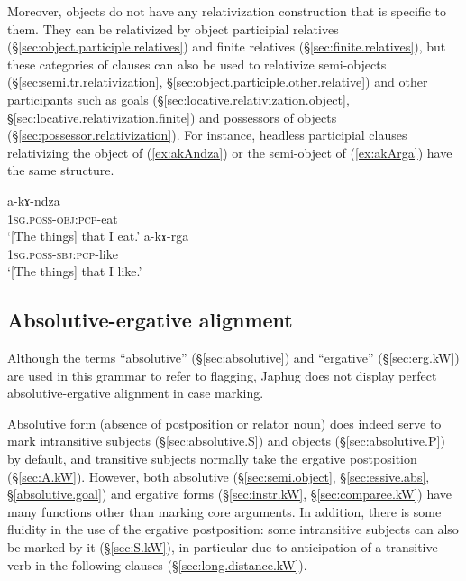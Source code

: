Moreover, objects do not have any relativization construction that is specific to them. They can be relativized by object participial relatives (§\ref{sec:object.participle.relatives}) and finite relatives (§\ref{sec:finite.relatives}), but these categories of clauses can also be used to relativize semi-objects (§\ref{sec:semi.tr.relativization}, §\ref{sec:object.participle.other.relative}) and other participants  such as goals (§\ref{sec:locative.relativization.object}, §\ref{sec:locative.relativization.finite}) and possessors of objects (§\ref{sec:possessor.relativization}). For instance, headless participial clauses relativizing the object of  (\ref{ex:akAndza}) or the semi-object of  (\ref{ex:akArga}) have the same structure.
 
\begin{exe} 
\ex 
\begin{xlist}
\ex \label{ex:akAndza}
\gll a-kɤ-ndza \\
\textsc{1sg}.\textsc{poss}-\textsc{obj}:\textsc{pcp}-eat \\
\glt `[The things] that I eat.' 
\ex \label{ex:akArga}
\gll a-kɤ-rga  \\
\textsc{1sg}.\textsc{poss}-\textsc{sbj}:\textsc{pcp}-like \\
\glt `[The things] that I like.' 
\end{xlist}
\end{exe}

\subsection{Absolutive-ergative alignment} \label{sec:ergativity}

Although the terms ``absolutive'' (§\ref{sec:absolutive}) and ``ergative'' (§\ref{sec:erg.kW}) are used in this grammar to refer to flagging, Japhug does not display perfect absolutive-ergative alignment in case marking.

Absolutive form (absence of postposition or relator noun) does indeed serve to mark intransitive subjects (§\ref{sec:absolutive.S}) and objects (§\ref{sec:absolutive.P}) by default, and transitive subjects normally take the ergative  postposition (§\ref{sec:A.kW}). However, both absolutive (§\ref{sec:semi.object}, §\ref{sec:essive.abs}, §\ref{absolutive.goal}) and ergative forms (§\ref{sec:instr.kW}, §\ref{sec:comparee.kW}) have many functions other than marking core arguments. In addition, there is some fluidity in the use of the ergative postposition: some intransitive subjects can also be marked by it (§\ref{sec:S.kW}), in particular due to anticipation of  a transitive verb in the following clauses (§\ref{sec:long.distance.kW}).



